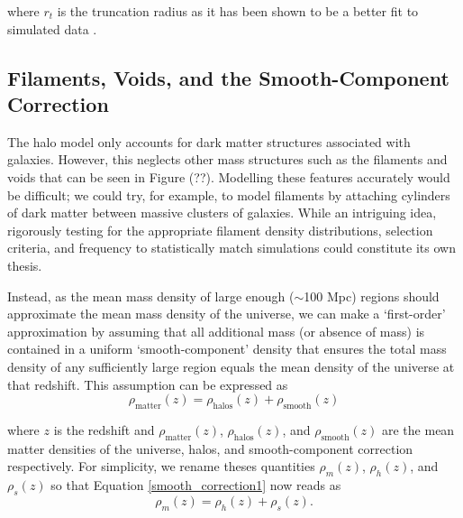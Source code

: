 \documentclass[%
 reprint,
 amsmath,amssymb,
 aps,nofootinbib
]{revtex4-1}
\begin{document}
\noindent where $r_t$ is the truncation radius as it has been shown to be a better fit to simulated data \cite{nfw_bmo}.


\subsection{Filaments, Voids, and the Smooth-Component Correction} \label{scc}

The halo model only accounts for dark matter structures associated with galaxies. However, this neglects other mass structures such as the filaments and voids that can be seen in Figure (??). Modelling these features accurately would be difficult; we could try, for example, to model filaments by attaching cylinders of dark matter between massive clusters of galaxies. While an intriguing idea, rigorously testing for the appropriate filament density distributions, selection criteria, and frequency to statistically match simulations could constitute its own thesis.


Instead, as the mean mass density of large enough ($\sim$100 Mpc) regions should approximate the mean mass density of the universe, we can make a `first-order' approximation by assuming that all additional mass (or absence of mass) is contained in a uniform `smooth-component' density that ensures the total mass density of any sufficiently large region equals the mean density of the universe at that redshift. This assumption can be expressed as
\begin{equation}\label{smooth_correction1}
\rho_{\text{matter}}(z)=\rho_{\text{halos}}(z)+\rho_{\text{smooth}}(z)
\end{equation}

\noindent where $z$ is the redshift and $\rho_{\text{matter}}(z)$, $\rho_{\text{halos}}(z)$, and $\rho_{\text{smooth}}(z)$ are the mean matter densities of the universe, halos, and smooth-component correction respectively. For simplicity, we rename theses quantities ${\rho_m(z)}$, ${\rho_h(z)}$, and ${\rho_s(z)}$ so that Equation \eqref{smooth_correction1} now reads as
\begin{equation}\label{smooth_correction2}
\rho_m(z)=\rho_h(z)+\rho_s(z).
\end{equation}
\end{document}
